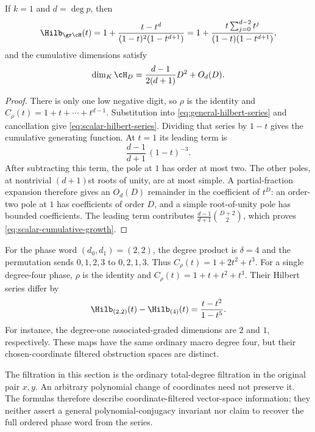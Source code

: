 \begin{corollary}
\label{cor:scalar-hilbert}
If $k=1$ and $d=\deg p$, then
\begin{equation}
  \Hilb_{\gr\cH}(t)
    =1+\frac{t-t^d}{(1-t)^2(1-t^{d+1})}
    =1+\frac{t\sum_{j=0}^{d-2}t^j}
                  {(1-t)(1-t^{d+1})},
  \label{eq:scalar-hilbert-series}
\end{equation}
and the cumulative dimensions satisfy
\begin{equation}
  \dim_K\cH_D=\frac{d-1}{2(d+1)}D^2+O_d(D).
  \label{eq:scalar-cumulative-growth}
\end{equation}
\end{corollary}

\begin{proof}
There is only one low negative digit, so $\rho$ is the identity and
$C_\rho(t)=1+t+\cdots+t^{d-1}$.  Substitution into
\eqref{eq:general-hilbert-series} and cancellation give
\eqref{eq:scalar-hilbert-series}.  Dividing that series by $1-t$
gives the cumulative generating function.  At $t=1$ its leading
term is
\[
  \frac{d-1}{d+1}\,(1-t)^{-3}.
\]
After subtracting this term, the pole at $1$ has order at most two.
The other poles, at nontrivial $(d+1)$st roots of unity, are at most
simple.  A partial-fraction expansion therefore gives an $O_d(D)$
remainder in the coefficient of $t^D$: an order-two pole at $1$
has coefficients of order $D$, and a simple root-of-unity pole has
bounded coefficients.  The leading term contributes
$\frac{d-1}{d+1}\binom{D+2}{2}$, which proves
\eqref{eq:scalar-cumulative-growth}.
\end{proof}

\begin{example}
\label{ex:same-degree}
For the phase word $(d_0,d_1)=(2,2)$, the degree product is
$\delta=4$ and the permutation sends $0,1,2,3$ to $0,2,1,3$.
Thus $C_\rho(t)=1+2t^2+t^3$.
For a single degree-four phase, $\rho$ is the identity and
$C_\rho(t)=1+t+t^2+t^3$.  Their Hilbert series differ by
\begin{equation}
  \Hilb_{(2,2)}(t)-\Hilb_{(4)}(t)
      =\frac{t-t^2}{1-t^5}.
  \label{eq:equal-degree-comparison}
\end{equation}
For instance, the degree-one associated-graded dimensions are $2$
and $1$, respectively.  These maps have the same ordinary macro
degree four, but their chosen-coordinate filtered obstruction spaces
are distinct.
\end{example}

The filtration in this section is the ordinary total-degree filtration
in the original pair $x,y$.  An arbitrary polynomial change of
coordinates need not preserve it.  The formulas therefore describe
coordinate-filtered vector-space information; they neither assert a
general polynomial-conjugacy invariant nor claim to recover the full
ordered phase word from the series.
